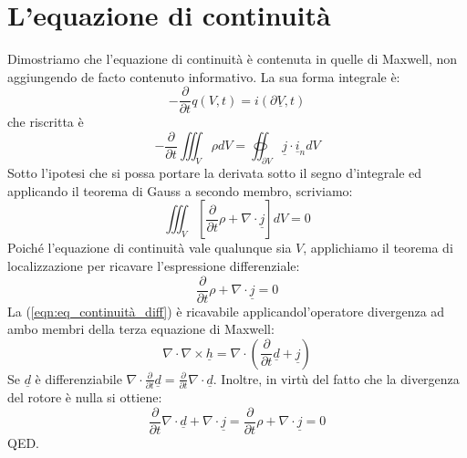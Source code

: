\documentclass{book}
\begin{document}
    \section{L'equazione di continuità}
        Dimostriamo che l'equazione di continuità è contenuta in quelle di Maxwell, non aggiungendo de facto contenuto informativo. La sua forma integrale è:
        \begin{equation}
            -\frac{\partial}{\partial t} q(V, t) = i(\partial \underline{V}, t)
        \end{equation}
        che riscritta è
        \begin{equation}
            -\frac{\partial}{\partial t} \iiint_{V} \rho dV = \oiint_{\partial V} \underline{j} \cdot \underline{i}_{n} dV 
        \end{equation}
        Sotto l'ipotesi che si possa portare la derivata sotto il segno d'integrale ed applicando il teorema di Gauss a secondo membro, scriviamo:
        \begin{equation}
            \iiint_{V} [\frac{\partial}{\partial t} \rho + \nabla \cdot \underline{j}]dV = 0
        \end{equation}
        Poiché l'equazione di continuità vale qualunque sia $V$, applichiamo il teorema di localizzazione per ricavare l'espressione differenziale:
        \begin{equation}
        \label{eqn:eq_continuità_diff}
            \frac{\partial}{\partial t} \rho + \nabla \cdot \underline{j} = 0
        \end{equation}
        La (\ref{eqn:eq_continuità_diff}) è ricavabile applicandol'operatore divergenza ad ambo membri della terza equazione di Maxwell:
        \begin{equation}
            \nabla \cdot \nabla \times \underline{h} = \nabla \cdot (\frac{\partial}{\partial t} \underline{d} + \underline{j})
        \end{equation}
        Se $\underline{d}$ è differenziabile $\nabla \cdot \frac{\partial}{\partial t} \underline{d} = \frac{\partial}{\partial t} \nabla \cdot \underline{d}$. Inoltre, in virtù del fatto che la divergenza del rotore è nulla si ottiene:
        \begin{equation}
            \frac{\partial}{\partial t} \nabla \cdot \underline{d} + \nabla \cdot \underline{j} = \frac{\partial}{\partial t} \rho + \nabla \cdot \underline{j} = 0
        \end{equation}
        QED. 
\end{document}
